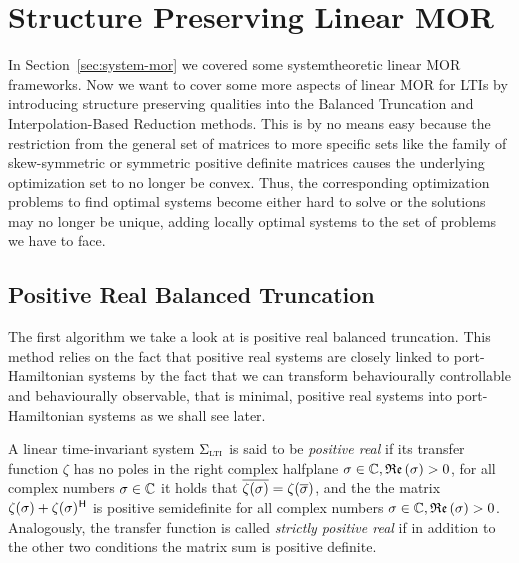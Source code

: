 \section{Structure Preserving Linear MOR}\label{sec:structure-preserving-mor}

In Section~\ref{sec:system-mor} we covered some systemtheoretic linear MOR frameworks.
Now we want to cover some more aspects of linear MOR for \acp{LTI} by introducing structure preserving qualities into the Balanced Truncation and Interpolation-Based Reduction methods.
This is by no means easy because the restriction from the general set of matrices to more specific sets like the family of skew-symmetric or symmetric positive definite matrices causes the underlying optimization set to no longer be convex.
Thus, the corresponding optimization problems to find optimal systems become either hard to solve or the solutions may no longer be unique, adding locally optimal systems to the set of problems we have to face.

\subsection{Positive Real Balanced Truncation}\label{subsec:prbt}

The first algorithm we take a look at is positive real balanced truncation.
This method relies on the fact that positive real systems are closely linked to port-Hamiltonian systems by the fact that we can transform behaviourally controllable and behaviourally observable, that is minimal, positive real systems into port-Hamiltonian systems as we shall see later.

\begin{definition}\label{def:positive-real}
    A linear time-invariant system $\Sigma_{\textnormal{\scshape lti}}$ is said to be \emph{positive real} if its transfer function $\zeta$ has no poles in the right complex halfplane $\sigma \in \mathbb{C}, \mathop{}\!\mathfrak{Re}\left(\sigma\right) > 0$, for all complex numbers $\sigma \in \mathbb{C}$ it holds that $\overline{\zeta(\sigma)} = \zeta(\overline{\sigma})$, and the the matrix $\zeta(\sigma) + \zeta(\sigma)^{\mkern1mu \mathsf{H}}$ is positive semidefinite for all complex numbers $\sigma \in \mathbb{C}, \mathop{}\!\mathfrak{Re}\left(\sigma\right) > 0$.
    Analogously, the transfer function is called \emph{strictly positive real} if in addition to the other two conditions the matrix sum is positive definite.
\end{definition}

